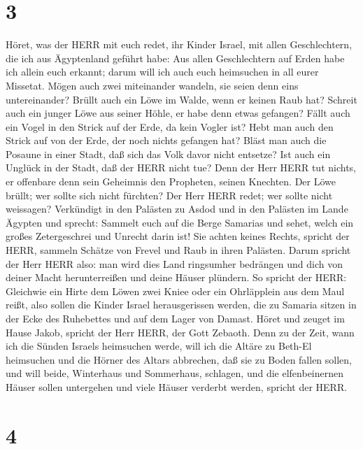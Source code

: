 \hypertarget{section-2}{%
\section{3}\label{section-2}}

 Höret, was der HERR mit euch redet, ihr Kinder Israel, mit
allen Geschlechtern, die ich aus Ägyptenland geführt habe: 
Aus allen Geschlechtern auf Erden habe ich allein euch erkannt; darum
will ich auch euch heimsuchen in all eurer Missetat.  Mögen
auch zwei miteinander wandeln, sie seien denn eins untereinander?
 Brüllt auch ein Löwe im Walde, wenn er keinen Raub hat?
Schreit auch ein junger Löwe aus seiner Höhle, er habe denn etwas
gefangen?  Fällt auch ein Vogel in den Strick auf der Erde,
da kein Vogler ist? Hebt man auch den Strick auf von der Erde, der noch
nichts gefangen hat?  Bläst man auch die Posaune in einer
Stadt, daß sich das Volk davor nicht entsetze? Ist auch ein Unglück in
der Stadt, daß der HERR nicht tue?  Denn der Herr HERR tut
nichts, er offenbare denn sein Geheimnis den Propheten, seinen Knechten.
 Der Löwe brüllt; wer sollte sich nicht fürchten? Der Herr
HERR redet; wer sollte nicht weissagen?  Verkündigt in den
Palästen zu Asdod und in den Palästen im Lande Ägypten und sprecht:
Sammelt euch auf die Berge Samarias und sehet, welch ein großes
Zetergeschrei und Unrecht darin ist!  Sie achten keines
Rechts, spricht der HERR, sammeln Schätze von Frevel und Raub in ihren
Palästen.  Darum spricht der Herr HERR also: man wird dies
Land ringsumher bedrängen und dich von deiner Macht herunterreißen und
deine Häuser plündern.  So spricht der HERR: Gleichwie ein
Hirte dem Löwen zwei Kniee oder ein Ohrläpplein aus dem Maul reißt, also
sollen die Kinder Israel herausgerissen werden, die zu Samaria sitzen in
der Ecke des Ruhebettes und auf dem Lager von Damast. 
Höret und zeuget im Hause Jakob, spricht der Herr HERR, der Gott
Zebaoth.  Denn zu der Zeit, wann ich die Sünden Israels
heimsuchen werde, will ich die Altäre zu Beth-El heimsuchen und die
Hörner des Altars abbrechen, daß sie zu Boden fallen sollen,
 und will beide, Winterhaus und Sommerhaus, schlagen, und
die elfenbeinernen Häuser sollen untergehen und viele Häuser verderbt
werden, spricht der HERR.

\hypertarget{section-3}{%
\section{4}\label{section-3}}

